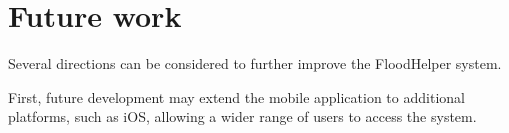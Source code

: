 \documentclass[../Main.tex]{subfiles}
\begin{document}

\section{Future work}

Several directions can be considered to further improve the FloodHelper system.

First, future development may extend the mobile application to additional platforms, such as iOS, allowing a wider range of users to access the system.
\end{document}
